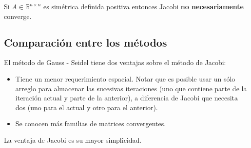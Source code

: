 \begin{obs}
Si $A \in \mathbb{R}^{n \times n}$ es simétrica definida positiva entonces Jacobi \textbf{no necesariamente} converge.
\end{obs}

\subsection{Comparación entre los métodos}
El método de Gauss - Seidel tiene dos ventajas sobre el método de Jacobi:
\begin{itemize}
\item Tiene un menor requerimiento espacial. Notar que es posible usar un sólo arreglo para almacenar las sucesivas iteraciones (uno que contiene parte de la iteración actual y parte de la anterior), a diferencia de Jacobi que necesita dos (uno para el actual y otro para el anterior).

\item Se conocen más familias de matrices convergentes.
\end{itemize}

La ventaja de Jacobi es su mayor simplicidad.